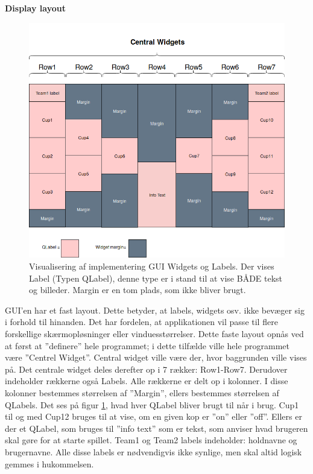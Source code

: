 \documentclass[Rapport/Rapport_main.tex]{subfiles}
\begin{document}
\textbf{Display layout}
\begin{figure}[H]
    \centering
    \includegraphics[scale=0.5]{Softwaredesign/GUI/Pictures/Boards_design.png}
    \caption{Visualisering af implementering GUI Widgets og Labels. Der vises Label (Typen QLabel), denne type er i stand til at vise BÅDE tekst og billeder. Margin er en tom plads, som ikke bliver brugt.    }
    \label{gui_design_implementering}
\end{figure}
GUI'en har et fast layout. Dette betyder, at labels, widgets osv. ikke bevæger sig i forhold til hinanden. Det har fordelen, at applikationen vil passe til flere forskellige skærmopløsninger eller vinduesstørrelser. Dette faste layout opnås ved at først at ''definere'' hele programmet; i dette tilfælde ville hele programmet være ''Centrel Widget''. Central widget ville være der, hvor baggrunden ville vises på. Det centrale widget deles derefter op i 7 rækker: Row1-Row7. Derudover indeholder rækkerne også Labels. Alle rækkerne er delt op i kolonner. I disse kolonner bestemmes størrelsen af ''Margin'', ellers bestemmes størrelsen af QLabels. Det ses på figur \ref{gui_design_implementering}, hvad hver QLabel bliver brugt til når i brug. Cup1 til og med Cup12 bruges til at vise, om en given kop er ''on'' eller ''off''. Ellers er der et QLabel, som bruges til ''info text'' som er tekst, som anviser hvad brugeren skal gøre for at starte spillet. Team1 og Team2 labels indeholder: holdnavne og brugernavne. Alle disse labels er nødvendigvis ikke synlige, men skal altid logisk gemmes i hukommelsen.
\end{document}
